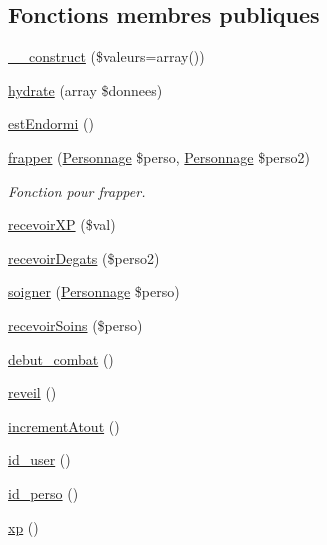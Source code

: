 \subsection*{Fonctions membres publiques}
\begin{DoxyCompactItemize}
\item 
\mbox{\hyperlink{class_personnage_ad91c080e67c8a8487933af4a38ea46cb}{\+\_\+\+\_\+construct}} (\$valeurs=array())
\item 
\mbox{\hyperlink{class_personnage_ae95e51cac2f518a6a38d025f5580be3f}{hydrate}} (array \$donnees)
\item 
\mbox{\hyperlink{class_personnage_aabf0bcd80fcea089de16f33c029aae12}{est\+Endormi}} ()
\item 
\mbox{\hyperlink{class_personnage_a1deaeddff5bc8766d52da4fc2d0b8032}{frapper}} (\mbox{\hyperlink{class_personnage}{Personnage}} \$perso, \mbox{\hyperlink{class_personnage}{Personnage}} \$perso2)
\begin{DoxyCompactList}\small\item\em Fonction pour frapper. \end{DoxyCompactList}\item 
\mbox{\hyperlink{class_personnage_aa64edf7d4c080193213b12643eb05a5d}{recevoir\+XP}} (\$val)
\item 
\mbox{\hyperlink{class_personnage_a226affce78dca0151e0901896e58f14d}{recevoir\+Degats}} (\$perso2)
\item 
\mbox{\hyperlink{class_personnage_a1219171b9ddba0fecfa49995d7d71372}{soigner}} (\mbox{\hyperlink{class_personnage}{Personnage}} \$perso)
\item 
\mbox{\hyperlink{class_personnage_acadb61228a3ebdf18318771f954e2ae0}{recevoir\+Soins}} (\$perso)
\item 
\mbox{\hyperlink{class_personnage_a570935e88aa03fb191a3f06a41f5aec5}{debut\+\_\+combat}} ()
\item 
\mbox{\hyperlink{class_personnage_ab0503fe49e1a5403fe6d43d7d424e3ef}{reveil}} ()
\item 
\mbox{\hyperlink{class_personnage_a744674b144008a43e37036344accb378}{increment\+Atout}} ()
\item 
\mbox{\hyperlink{class_personnage_a83ccdd40630a166b7a1f5c84dd742e8c}{id\+\_\+user}} ()
\item 
\mbox{\hyperlink{class_personnage_aa34eed6a48eb3734596505b58497f2f1}{id\+\_\+perso}} ()
\item 
\mbox{\hyperlink{class_personnage_a60b2a6a44bc71517c063d87c062e0b87}{xp}} ()
\item 

\end{DoxyCompactItemize}
